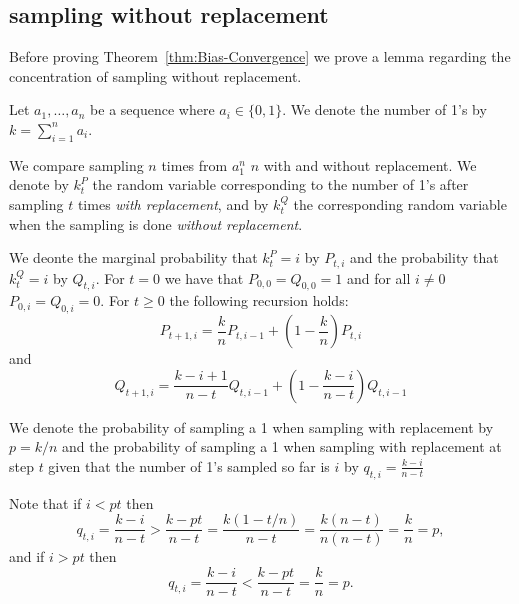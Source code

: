 \subsection{sampling without replacement}

\newcommand{\p}{p}
\newcommand{\q}{q_{t,i}}


\newcommand{\cnt}[2]{k^{#1}_{#2}}

\newcommand{\prob}[2]{#1_{#2}}

\newcommand{\tail}[3]{{\mathbf #1}^{#2}_{#3}}



Before proving Theorem~\ref{thm:Bias-Convergence} we prove a 
lemma regarding the concentration of sampling without replacement.

Let $a_1,\ldots,a_n$ be a sequence where $a_i \in
\{0,1\}$. We denote the number of 1's by $k=\sum_{i=1}^n a_i$.

We compare sampling $n$ times from $a_1^n$ $n$ with and without
replacement. We denote by $\cnt{P}{t}$ the random variable
corresponding to the number of 1's after sampling $t$ times {\em with
  replacement}, and by $\cnt{Q}{t}$ the corresponding random
variable when the sampling is done {\em without replacement}.

We deonte the marginal probability that $\cnt{P}{t}=i$ by
$\prob{P}{t,i}$ and the probability that $\cnt{Q}{t}=i$ by
$\prob{Q}{t,i}$. For $t=0$ we have that 
$\prob{P}{0,0}=\prob{Q}{0,0}=1$ and for all $i\neq 0$
$\prob{P}{0,i}=\prob{Q}{0,i}=0$.
For $t \geq 0$ the following recursion holds:
\[
\prob{P}{t+1,i}=\frac{k}{n} \prob{P}{t,i-1} + \left(1-\frac{k}{n}\right)\prob{P}{t,i}
\]
and
\[
\prob{Q}{t+1,i}=\frac{k-i+1}{n-t}\prob{Q}{t,i-1} + \left(1-\frac{k-i}{n-t}\right)\prob{Q}{t,i-1}
\]

We denote the probability of sampling a 1 when sampling with
replacement by $\p=k/n$ and the probability of sampling a 1 when
sampling with replacement at step $t$ given that the number of 1's
sampled so far is $i$ by $\q=\frac{k-i}{n-t}$

Note that if $i < \p t$ then
\[
\q=\frac{k-i}{n-t} > \frac{k-\p t}{n-t} = \frac{k(1-t/n)}{n-t} =
\frac{k(n-t)}{n(n-t)} = \frac{k}{n}=\p,
\]
and if $i > \p t$ then
\[
\q=\frac{k-i}{n-t} < \frac{k-\p t}{n-t} = \frac{k}{n}=\p.
\]

